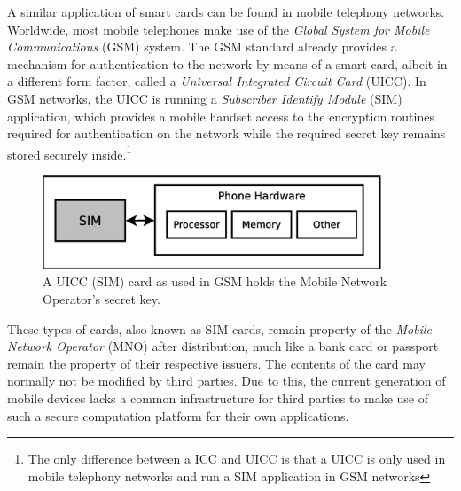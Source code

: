 A similar application of smart cards can be found in mobile telephony networks.
Worldwide, most mobile telephones make use of the \textit{Global System for Mobile Communications} (GSM) system.
The GSM standard already provides a mechanism for authentication to the network by means of a smart card, albeit in a different form factor, called a \textit{Universal Integrated Circuit Card} (UICC).
In GSM networks, the UICC is running a \textit{Subscriber Identify Module} (SIM) application, which provides a mobile handset access to the encryption routines required for authentication on the network while the required secret key remains stored securely inside.\footnote{The only difference between a ICC and UICC is that a UICC is only used in mobile telephony networks and run a SIM application in GSM networks}

\begin{figure}
\includegraphics[width=0.9\textwidth]{images/SIM_in_GSM}
\caption[UICC running SIM application in GSM]
{
A UICC (SIM) card as used in GSM holds the Mobile Network Operator's secret key.
}
\label{fig:gsm_sim}
\end{figure}

These types of cards, also known as SIM cards, remain property of the \textit{Mobile Network Operator} (MNO) after distribution, much like a bank card or passport remain the property of their respective issuers. %
The contents of the card may normally not be modified by third parties.
Due to this, the current generation of mobile devices lacks a common infrastructure for third parties to make use of such a secure computation platform for their own applications.



